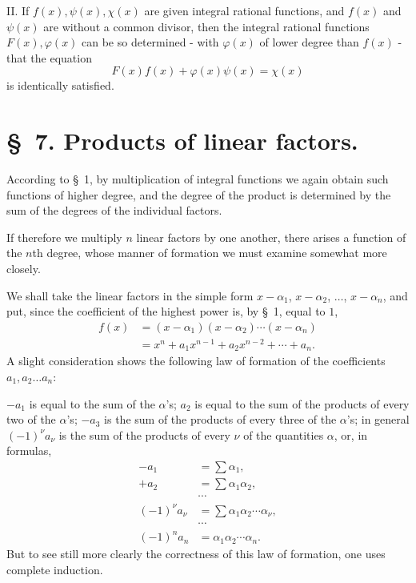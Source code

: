 \documentclass[11pt]{article}
\begin{document}
II. If $f(x),\psi(x),\chi(x)$ are given integral rational functions, and $f(x)$ and $\psi(x)$ are without a common divisor, then the integral rational functions $F(x),\varphi(x)$ can be so determined - with $\varphi(x)$ of lower degree than $f(x)$ - that the equation
\begin{equation}
 F(x)f(x)+\varphi(x)\psi(x)=\chi(x)
\tag{26}
\end{equation}
is identically satisfied.

\section*{\S~7. Products of linear factors.}

According to \S~1, by multiplication of integral functions we again obtain such functions of higher degree, and the degree of the product is determined by the sum of the degrees of the individual factors.

If therefore we multiply $n$ linear factors by one another, there arises a function of the $n$th degree, whose manner of formation we must examine somewhat more closely.

We shall take the linear factors in the simple form $x-\alpha_1$, $x-\alpha_2$, $\ldots$, $x-\alpha_n$, and put, since the coefficient of the highest power is, by \S~1, equal to $1$,
\begin{equation}
\begin{aligned}
 f(x)&=(x-\alpha_1)(x-\alpha_2)\cdots(x-\alpha_n)\\
 &=x^n+a_1x^{n-1}+a_2x^{n-2}+\cdots+a_n.
\end{aligned}
\tag{1}
\end{equation}
A slight consideration shows the following law of formation of the coefficients $a_1,a_2\ldots a_n$:

$-a_1$ is equal to the sum of the $\alpha$'s; $a_2$ is equal to the sum of the products of every two of the $\alpha$'s; $-a_3$ is the sum of the products of every three of the $\alpha$'s; in general $(-1)^\nu a_\nu$ is the sum of the products of every $\nu$ of the quantities $\alpha$, or, in formulas,
\begin{equation}
\begin{aligned}
-a_1&=\sum \alpha_1,\\
+a_2&=\sum \alpha_1\alpha_2,\\
&\cdots\\
(-1)^\nu a_\nu&=\sum \alpha_1\alpha_2\cdots\alpha_\nu,\\
&\cdots\\
(-1)^n a_n&=\alpha_1\alpha_2\cdots\alpha_n.
\end{aligned}
\tag{2}
\end{equation}
But to see still more clearly the correctness of this law of formation, one uses complete induction.
\end{document}
